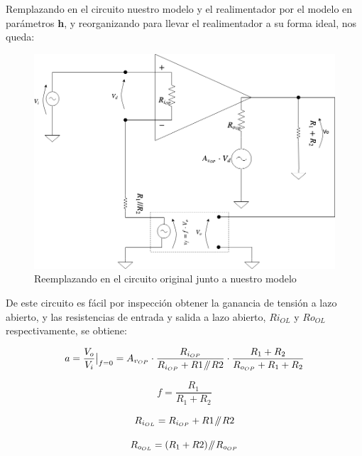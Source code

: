 Remplazando en el circuito nuestro modelo y el realimentador por el modelo en parámetros \textbf{h}, y reorganizando para llevar el realimentador a su forma ideal, nos queda:


\begin{figure}[H] %
\begin{center}
\includegraphics[width=0.9 \textwidth, angle=0]{./img/operacionales/OP_NONIDEAL_MODEL_NINV_FEEDBACK_PARAMETERS.png}
\caption{\label{fig:fig_nideal_ninv_feedback_pars}\footnotesize{Reemplazando en el circuito original junto a nuestro modelo}}
\end{center}
\end{figure}

De este circuito es fácil por inspección obtener la ganancia de tensión a lazo abierto,  y las resistencias de entrada y salida a lazo abierto, $R{i_{OL}}$ y $R{o_{OL}}$ respectivamente, se obtiene:


\begin{equation}
a =  \evalat{\frac{V_{o}}{V_{i}}}{f=0} = A_{v_{OP}} \cdot \frac{R_{i_{OP}}}{R_{i_{OP}} + R{1} \parallelresistors R{2} } \cdot \frac{ R_{1} + R_{2}}{R_{o_{OP}} + R_{1} + R_{2} }
\end{equation}

\begin{equation}
f =  \frac{R_{1}}{R_{1} + R_{2}}
\end{equation}

\begin{equation}
R_{i_{OL}} = R_{i_{OP}} + R{1} \mathbin{\!/\mkern-5mu/\!} R{2}
\end{equation}

\begin{equation}
R_{o_{OL}} = \left( R_{1} + R{2} \right) \mathbin{\!/\mkern-5mu/\!} R_{o_{OP}}
\end{equation}

